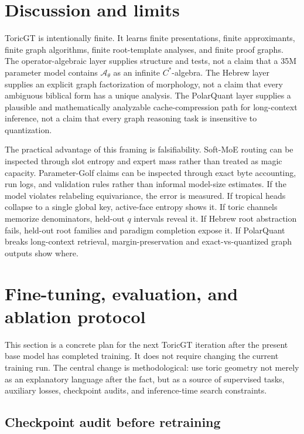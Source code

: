 \documentclass[11pt]{article}
\theoremstyle{definition}
\theoremstyle{plain}
\theoremstyle{remark}
\numberwithin{equation}{section}
\newcommand{\A}{\mathcal{A}}
\begin{document}
\section{Discussion and limits}

ToricGT is intentionally finite.  It learns finite presentations, finite approximants, finite graph algorithms, finite root-template analyses, and finite proof graphs.  The operator-algebraic layer supplies structure and tests, not a claim that a 35M parameter model contains $\A_\theta$ as an infinite $C^*$-algebra.  The Hebrew layer supplies an explicit graph factorization of morphology, not a claim that every ambiguous biblical form has a unique analysis.  The PolarQuant layer supplies a plausible and mathematically analyzable cache-compression path for long-context inference, not a claim that every graph reasoning task is insensitive to quantization.

The practical advantage of this framing is falsifiability.  Soft-MoE routing can be inspected through slot entropy and expert mass rather than treated as magic capacity.  Parameter-Golf claims can be inspected through exact byte accounting, run logs, and validation rules rather than informal model-size estimates.  If the model violates relabeling equivariance, the error is measured.  If tropical heads collapse to a single global key, active-face entropy shows it.  If toric channels memorize denominators, held-out $q$ intervals reveal it.  If Hebrew root abstraction fails, held-out root families and paradigm completion expose it.  If PolarQuant breaks long-context retrieval, margin-preservation and exact-vs-quantized graph outputs show where.

\section{Fine-tuning, evaluation, and ablation protocol}

This section is a concrete plan for the next ToricGT iteration after the present base model has completed training.  It does not require changing the current training run.  The central change is methodological: use toric geometry not merely as an explanatory language after the fact, but as a source of supervised tasks, auxiliary losses, checkpoint audits, and inference-time search constraints.

\subsection{Checkpoint audit before retraining}
\end{document}
